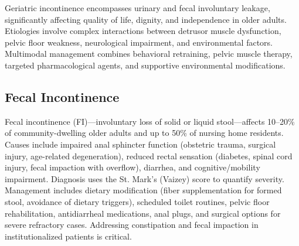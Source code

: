 

Geriatric incontinence encompasses urinary and fecal involuntary leakage, significantly affecting quality of life, dignity, and independence in older adults. Etiologies involve complex interactions between detrusor muscle dysfunction, pelvic floor weakness, neurological impairment, and environmental factors. Multimodal management combines behavioral retraining, pelvic muscle therapy, targeted pharmacological agents, and supportive environmental modifications.





\label{sec:Incontinence}

\subsection{Fecal Incontinence}
\label{sec:Fecal Incontinence}

Fecal incontinence (FI)---involuntary loss of solid or liquid stool---affects 10--20\% of community-dwelling older adults and up to 50\% of nursing home residents. Causes include impaired anal sphincter function (obstetric trauma, surgical injury, age-related degeneration), reduced rectal sensation (diabetes, spinal cord injury, fecal impaction with overflow), diarrhea, and cognitive/mobility impairment. Diagnosis uses the St. Mark's (Vaizey) score to quantify severity. Management includes dietary modification (fiber supplementation for formed stool, avoidance of dietary triggers), scheduled toilet routines, pelvic floor rehabilitation, antidiarrheal medications, anal plugs, and surgical options for severe refractory cases. Addressing constipation and fecal impaction in institutionalized patients is critical.

